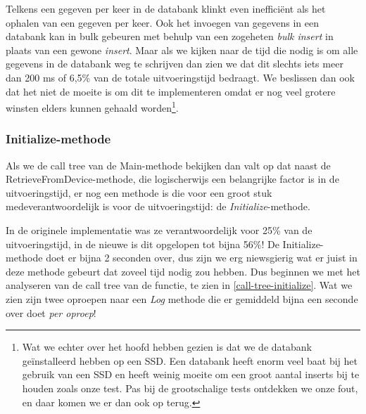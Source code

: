 Telkens een gegeven per keer in de databank klinkt even inefficiënt als het ophalen van een gegeven per keer.
Ook het invoegen van gegevens in een databank kan in bulk gebeuren met behulp van een zogeheten \textit{bulk insert} in plaats van een gewone \textit{insert}.
Maar als we kijken naar de tijd die nodig is om alle gegevens in de databank weg te schrijven dan zien we dat
dit slechts iets meer dan 200 ms of 6,5\% van de totale uitvoeringstijd bedraagt.
We beslissen dan ook dat het niet de moeite is om dit te implementeren omdat er nog veel grotere winsten elders kunnen gehaald worden\footnote{
	Wat we echter over het hoofd hebben gezien is dat we de databank geïnstalleerd hebben op een SSD.
	Een databank heeft enorm veel baat bij het gebruik van een SSD en heeft weinig moeite om een groot aantal inserts bij te houden zoals onze test.
	Pas bij de grootschalige tests ontdekken we onze fout, en daar komen we er dan ook op terug.
}.


\subsubsection{Initialize-methode}

Als we de call tree van de Main-methode bekijken dan valt op dat naast de RetrieveFromDevice-methode,
die logischerwijs een belangrijke factor is in de uitvoeringstijd,
er nog een methode is die voor een groot stuk medeverantwoordelijk is voor de uitvoeringstijd: de \textit{Initialize}-methode.

In de originele implementatie was ze verantwoordelijk voor 25\% van de uitvoeringstijd, in de nieuwe is dit opgelopen tot bijna 56\%!
De Initialize-methode doet er bijna 2 seconden over, dus zijn we erg niewsgierig wat er juist in deze methode gebeurt dat zoveel tijd nodig zou hebben.
Dus beginnen we met het analyseren van de call tree van de functie, te zien in \cref{call-tree-initialize}.
Wat we zien zijn twee oproepen naar een \emph{Log} methode die er gemiddeld bijna een seconde over doet \emph{per oproep}! %

